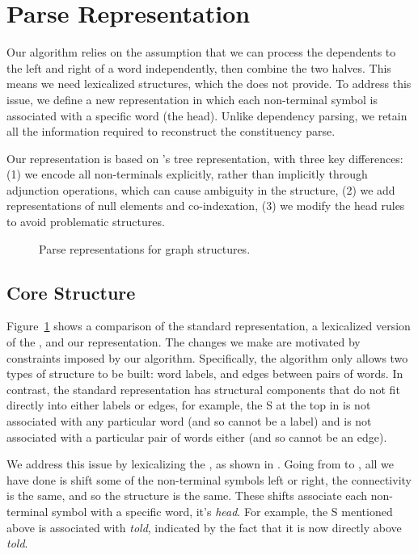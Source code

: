 \section{Parse Representation} \label{sec:representation}

Our algorithm relies on the assumption that we can process the dependents to the left and right of a word independently, then combine the two halves.
This means we need lexicalized structures, which the \ptb does not provide.
To address this issue, we define a new representation in which each non-terminal symbol is associated with a specific word (the head).
Unlike dependency parsing, we retain all the information required to reconstruct the constituency parse.

Our representation is based on \textcite{cck}'s tree representation, with three key differences:
(1) we encode all non-terminals explicitly, rather than implicitly through adjunction operations, which can cause ambiguity in the structure,
(2) we add representations of null elements and co-indexation,
(3) we modify the head rules to avoid problematic structures.

\begin{figure}
  
  \caption[Parse representations for graph structures.]{ \label{fig:repr2}
    Parse representations for graph structures.
  }
\end{figure}

\subsection{Core Structure} \label{sec:rep-core}

Figure~\ref{fig:repr2} shows a comparison of the standard \ptb representation, a lexicalized version of the \ptb, and our representation.
The changes we make are motivated by constraints imposed by our algorithm.
Specifically, the algorithm only allows two types of structure to be built: word labels, and edges between pairs of words.
In contrast, the standard \ptb representation has structural components that do not fit directly into either labels or edges, for example, the S at the top in  is not associated with any particular word (and so cannot be a label) and is not associated with a particular pair of words either (and so cannot be an edge).

We address this issue by lexicalizing the \ptb, as shown in .
Going from  to , all we have done is shift some of the non-terminal symbols left or right, the connectivity is the same, and so the structure is the same.
These shifts associate each non-terminal symbol with a specific word, it's \emph{head}.
For example, the S mentioned above is associated with \emph{told}, indicated by the fact that it is now directly above \emph{told}.

